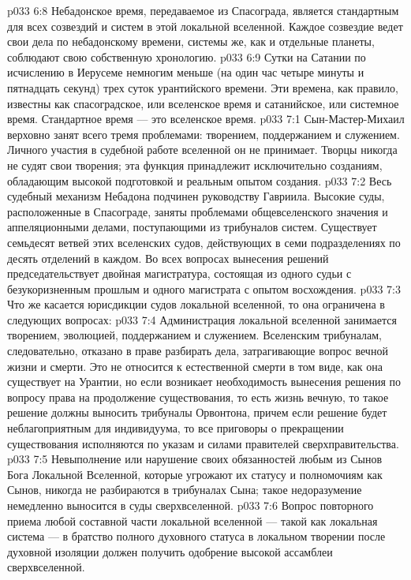 \vs p033 6:8 Небадонское время, передаваемое из Спасограда, является стандартным для всех созвездий и систем в этой локальной вселенной. Каждое созвездие ведет свои дела по небадонскому времени, системы же, как и отдельные планеты, соблюдают свою собственную хронологию.
\vs p033 6:9 Сутки на Сатании по исчислению в Иерусеме немногим меньше (на один час четыре минуты и пятнадцать секунд) трех суток урантийского времени. Эти времена, как правило, известны как спасоградское, или вселенское время и сатанийское, или системное время. Стандартное время --- это вселенское время.
\vs p033 7:1 Сын\hyp{}Мастер\hyp{}Михаил верховно занят всего тремя проблемами: творением, поддержанием и служением. Личного участия в судебной работе вселенной он не принимает. Творцы никогда не судят свои творения; эта функция принадлежит исключительно созданиям, обладающим высокой подготовкой и реальным опытом создания.
\vs p033 7:2 Весь судебный механизм Небадона подчинен руководству Гавриила. Высокие суды, расположенные в Спасограде, заняты проблемами общевселенского значения и аппеляционными делами, поступающими из трибуналов систем. Существует семьдесят ветвей этих вселенских судов, действующих в семи подразделениях по десять отделений в каждом. Во всех вопросах вынесения решений председательствует двойная магистратура, состоящая из одного судьи с безукоризненным прошлым и одного магистрата с опытом восхождения.
\vs p033 7:3 Что же касается юрисдикции судов локальной вселенной, то она ограничена в следующих вопросах:
\vs p033 7:4 \bibnobreakspace Администрация локальной вселенной занимается творением, эволюцией, поддержанием и служением. Вселенским трибуналам, следовательно, отказано в праве разбирать дела, затрагивающие вопрос вечной жизни и смерти. Это не относится к естественной смерти в том виде, как она существует на Урантии, но если возникает необходимость вынесения решения по вопросу права на продолжение существования, то есть жизнь вечную, то такое решение должны выносить трибуналы Орвонтона, причем если решение будет неблагоприятным для индивидуума, то все приговоры о прекращении существования исполняются по указам и силами правителей сверхправительства.
\vs p033 7:5 \pc {}\bibnobreakspace Невыполнение или нарушение своих обязанностей любым из Сынов Бога Локальной Вселенной, которые угрожают их статусу и полномочиям как Сынов, никогда не разбираются в трибуналах Сына; такое недоразумение немедленно выносится в суды сверхвселенной.
\vs p033 7:6 \pc {}\bibnobreakspace Вопрос повторного приема любой составной части локальной вселенной --- такой как локальная система --- в братство полного духовного статуса в локальном творении после духовной изоляции должен получить одобрение высокой ассамблеи сверхвселенной.
